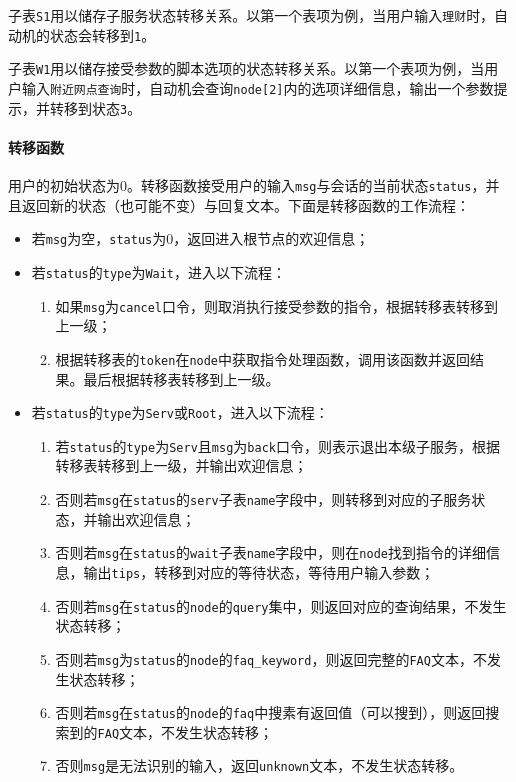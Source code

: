 \documentclass[hyperref]{ctexart}
\begin{document}
\par 子表\texttt{S1}用以储存子服务状态转移关系。以第一个表项为例，当用户输入\texttt{理财}时，自动机的状态会转移到\texttt{1}。
\par 子表\texttt{W1}用以储存接受参数的脚本选项的状态转移关系。以第一个表项为例，当用户输入\texttt{附近网点查询}时，自动机会查询\texttt{node[2]}内的选项详细信息，输出一个参数提示，并转移到状态\texttt{3}。
\paragraph{转移函数}
用户的初始状态为0。转移函数接受用户的输入\texttt{msg}与会话的当前状态\texttt{status}，并且返回新的状态（也可能不变）与回复文本。下面是转移函数的工作流程：
\begin{itemize}
    \item 若\texttt{msg}为空，\texttt{status}为0，返回进入根节点的欢迎信息；
    \item 若\texttt{status}的\texttt{type}为\texttt{Wait}，进入以下流程：
    \begin{enumerate}
        \item 如果\texttt{msg}为\texttt{cancel}口令，则取消执行接受参数的指令，根据转移表转移到上一级；
        \item 根据转移表的\texttt{token}在\texttt{node}中获取指令处理函数，调用该函数并返回结果。最后根据转移表转移到上一级。
    \end{enumerate}
    \item 若\texttt{status}的\texttt{type}为\texttt{Serv}或\texttt{Root}，进入以下流程：
    \begin{enumerate}
        \item 若\texttt{status}的\texttt{type}为\texttt{Serv}且\texttt{msg}为\texttt{back}口令，则表示退出本级子服务，根据转移表转移到上一级，并输出欢迎信息；
        \item 否则若\texttt{msg}在\texttt{status}的\texttt{serv}子表\texttt{name}字段中，则转移到对应的子服务状态，并输出欢迎信息；
        \item 否则若\texttt{msg}在\texttt{status}的\texttt{wait}子表\texttt{name}字段中，则在\texttt{node}找到指令的详细信息，输出\texttt{tips}，转移到对应的等待状态，等待用户输入参数；
        \item 否则若\texttt{msg}在\texttt{status}的\texttt{node}的\texttt{query}集中，则返回对应的查询结果，不发生状态转移；
        \item 否则若\texttt{msg}为\texttt{status}的\texttt{node}的\texttt{faq\_keyword}，则返回完整的\texttt{FAQ}文本，不发生状态转移；
        \item 否则若\texttt{msg}在\texttt{status}的\texttt{node}的\texttt{faq}中搜素有返回值（可以搜到），则返回搜索到的\texttt{FAQ}文本，不发生状态转移；
        \item 否则\texttt{msg}是无法识别的输入，返回\texttt{unknown}文本，不发生状态转移。
    \end{enumerate}
\end{itemize}
\end{document}
